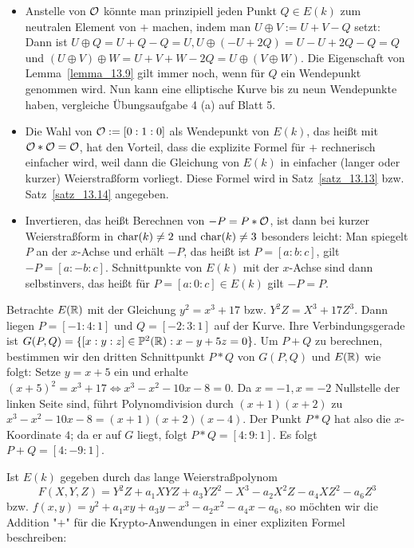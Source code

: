 \begin{bem}
	\begin{itemize}
		\item Anstelle von $\mathcal{O}$ könnte man prinzipiell jeden Punkt $Q \in E(k)$ zum neutralen Element von $+$ machen, indem man $U \oplus V := U + V - Q$ setzt: Dann ist $U \oplus Q = U + Q - Q = U, U \oplus(-U+2Q) = U-U+2Q-Q = Q$ und $(U \oplus V) \oplus W = U + V + W - 2Q = U \oplus (V \oplus W)$. Die Eigenschaft von Lemma~\ref{lemma_13.9} gilt immer noch, wenn für $Q$ ein Wendepunkt genommen wird. Nun kann eine elliptische Kurve bis zu neun Wendepunkte haben, vergleiche Übungsaufgabe 4 (a) auf Blatt 5.
		\item Die Wahl von $\mathcal{O} := [0:1:0]$ als Wendepunkt von $E(k)$, das heißt mit $\mathcal{O} * \mathcal{O} = \mathcal{O}$, hat den Vorteil, dass die explizite Formel für $+$ rechnerisch einfacher wird, weil dann die Gleichung von $E(k)$ in einfacher (langer oder kurzer) Weierstraßform vorliegt. Diese Formel wird in Satz~\ref{satz_13.13} bzw. Satz~\ref{satz_13.14} angegeben.
		\item Invertieren, das heißt Berechnen von $-P = P * \mathcal{O}$, ist dann bei kurzer Weierstraßform in $\operatorname{char}(k) \neq 2$ und $\operatorname{char}(k) \neq 3$ besonders leicht: Man spiegelt $P$ an der $x$-Achse und erhält $-P$, das heißt ist $P = [a:b:c]$, gilt $-P = [a:-b:c]$. Schnittpunkte von $E(k)$ mit der $x$-Achse sind dann selbstinvers, das heißt für $P = [a:0:c] \in E(k)$ gilt $-P = P$.
	\end{itemize}
\end{bem}

\begin{bsp}
	Betrachte $E(\mathbb{R})$ mit der Gleichung $y^2 = x^3 + 17$ bzw. $Y^2Z = X^3 + 17Z^3$. Dann liegen $P = [-1:4:1]$ und $Q = [-2:3:1]$ auf der Kurve. Ihre Verbindungsgerade ist $G(P,Q) = \{ [x:y:z] \in \mathbb{P}^2(\mathbb{R}) : x-y+5z = 0\}$. Um $P+Q$ zu berechnen, bestimmen wir den dritten Schnittpunkt $P*Q$ von $G(P,Q)$ und $E(\mathbb{R})$ wie folgt: Setze $y = x + 5$ ein und erhalte $(x+5)^2 = x^3 + 17 \Leftrightarrow x^3 - x^2 - 10x - 8 = 0$. Da $x = -1, x = -2$ Nullstelle der linken Seite sind, führt Polynomdivision durch $(x+1)(x+2)$ zu $x^3-x^2-10x-8 = (x+1)(x+2)(x-4)$. Der Punkt $P * Q$ hat also die $x$-Koordinate $4$; da er auf $G$ liegt, folgt $P*Q = [4:9:1]$. Es folgt $P + Q = [4:-9:1]$.
\end{bsp}

Ist $E(k)$ gegeben durch das lange Weierstraßpolynom
\[ F(X,Y,Z) = Y^2Z + a_1 XYZ + a_3 YZ^2 - X^3 - a_2X^2Z - a_4 XZ^2 - a_6 Z^3 \]
bzw. $f(x,y) = y^2 + a_1xy + a_3y - x^3 - a_2x^2 - a_4x - a_6$, so möchten wir die Addition "$+$" für die Krypto-Anwendungen in einer expliziten Formel beschreiben:

